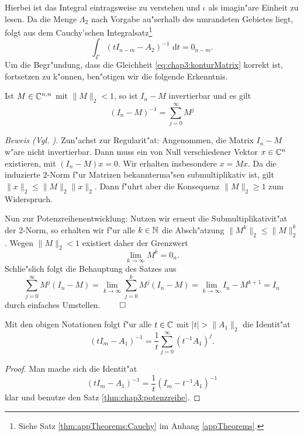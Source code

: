 Hierbei ist das Integral eintragsweise zu verstehen und $\iota$ als imagin"are Einheit zu lesen.
Da die Menge $\Lambda_2$ nach Vorgabe au"serhalb des umrandeten Gebietes liegt, folgt aus dem Cauchy'schen Integralsatz\footnote{Siehe Satz \ref{thm:appTheorems:Cauchy} im Anhang \ref{appTheorems}.}
\[
\int_\Gamma (t I_{n-m} - A_2)^{-1} \text{ d}t = 0_{n-m}.
\]
Um die Begr"undung, dass die Gleichheit \eqref{eq:chap3:konturMatrix} korrekt ist, fortsetzen zu k"onnen, ben"otigen wir die folgende Erkenntnis.

\begin{thm}\label{thm:chap3:potenzreihe}
Ist $M\in\mathbb{C}^{n,n}$ mit $\|M\|_2 < 1$, so ist $I_n - M$ invertierbar und es gilt
\[
(I_n - M)^{-1} = \sum_{j=0}^\infty M^j
\]
\end{thm}

\textit{Beweis (Vgl. \cite[Abschnitt 2.3.4]{loan}).}
Zun"achst zur Regularit"at: Angenommen, die Matrix $I_n-M$ w"are nicht invertierbar. Dann muss ein von Null verschiedener Vektor $x\in\mathbb{C}^n$ existieren, mit $(I_n-M)x = 0$.
Wir erhalten insbesondere $x = Mx$. Da die induzierte $2$-Norm f"ur Matrizen bekannterma"sen submultiplikativ ist, gilt $\|x\|_2 \le \|M\|_2\|x\|_2$. Dann f"uhrt aber die Konsequenz $\|M\|_2 \ge 1$ zum Widerspruch.

\newpage

Nun zur Potenzreihenentwicklung: Nutzen wir erneut die Submultiplikativit"at der $2$-Norm, so erhalten wir f"ur alle $k\in\mathbb{N}$ die Absch"atzung $\|M^k\|_2 \le \|M\|_2^k$. Wegen $\|M\|_2 <1$ existiert daher der Grenzwert
\[
\lim_{k\to\infty} M^k = 0_n.
\]
Schlie"slich folgt die Behauptung des Satzes aus
\[
\sum_{j=0}^\infty M^j (I_n-M) =
\lim_{k\to\infty}\sum_{j=0}^k M^j (I_n-M) =
\lim_{k\to\infty} I_n-M^{k+1} = I_n
\]
durch einfaches Umstellen. \hfill $\qed$

\begin{kor}\label{kor:chap3:potenzreihe}
Mit den obigen Notationen folgt f"ur alle $t\in\mathbb{C}$ mit $|t| > \|A_1\|_2$ die Identit"at
\[
(t I_m - A_1)^{-1} = \frac{1}{t} \sum_{j=0}^\infty (t^{-1} A_1)^j.
\]
\end{kor}
\begin{proof}
Man mache sich die Identit"at
\[
(t I_m - A_1)^{-1} = \frac{1}{t}(I_m - t^{-1}A_1)^{-1}
\]
klar und benutze den Satz \ref{thm:chap3:potenzreihe}.
\end{proof}

